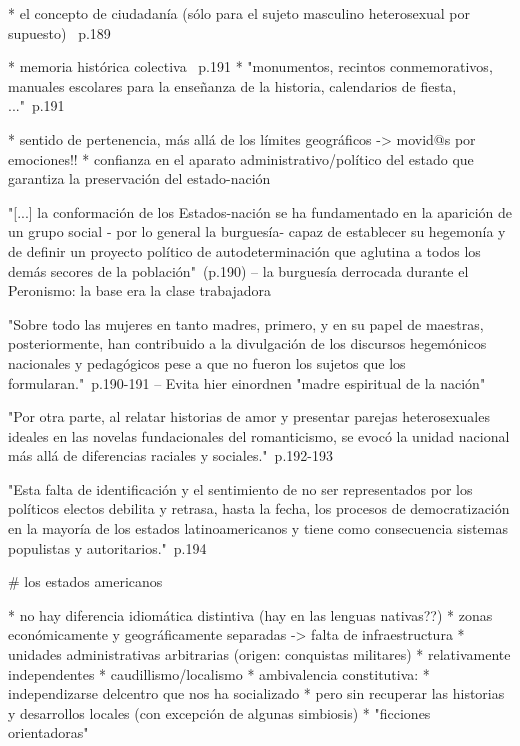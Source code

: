 * el concepto de ciudadanía (sólo para el sujeto masculino heterosexual por supuesto) ~\cite{SzIr2009}{p.189}

* memoria histórica colectiva ~\cite{SzIr2009}{p.191}
* "monumentos, recintos conmemorativos, manuales escolares para la enseñanza de la historia, calendarios de fiesta, ..."~\cite{SzIr2009}{p.191}

* sentido de pertenencia, más allá de los límites geográficos -> movid@s por emociones!!
* confianza en el aparato administrativo/político del estado que garantiza la preservación del estado-nación

"[...] la conformación de los Estados-nación se ha fundamentado en la aparición de un grupo social - por lo general la burguesía- capaz de establecer su hegemonía y de definir un proyecto político de autodeterminación que aglutina a todos los demás secores de la población"~\cite{SzIr2009}(p.190)
-- la burguesía derrocada durante el Peronismo: la base era la clase trabajadora

"Sobre todo las mujeres en tanto madres, primero, y en su papel de maestras, posteriormente, han contribuido a la divulgación de los discursos hegemónicos nacionales y pedagógicos pese a que no fueron los sujetos que los formularan."~\cite{SzIr2009}{p.190-191}
-- Evita hier einordnen "madre espiritual de la nación"

"Por otra parte, al relatar historias de amor y presentar parejas heterosexuales ideales en las novelas fundacionales del romanticismo, se evocó la unidad nacional más allá de diferencias raciales y sociales."~\cite{SzIr2009}{p.192-193}

"Esta falta de identificación y el sentimiento de no ser representados por los políticos electos debilita y retrasa, hasta la fecha, los procesos de democratización en la mayoría de los estados latinoamericanos y tiene como consecuencia sistemas populistas y autoritarios."~\cite{SzIr2009}{p.194}

# los estados americanos

* no hay diferencia idiomática distintiva (hay en las lenguas nativas??)
* zonas económicamente y geográficamente separadas -> falta de infraestructura
* unidades administrativas arbitrarias (origen: conquistas militares)
* relativamente independentes
* caudillismo/localismo
* ambivalencia constitutiva:
  * independizarse delcentro que nos ha socializado
  * pero sin recuperar las historias y desarrollos locales (con excepción de algunas simbiosis)
* "ficciones orientadoras"

